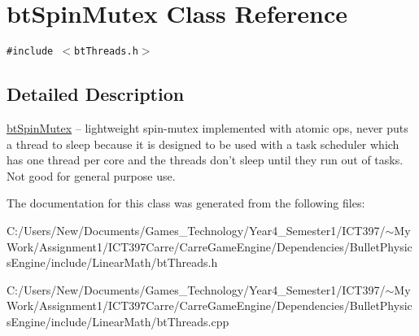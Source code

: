 \hypertarget{classbt_spin_mutex}{
\section{btSpinMutex Class Reference}
\label{classbt_spin_mutex}
}
{\tt \#include $<$btThreads.h$>$}



\subsection{Detailed Description}
\hyperlink{classbt_spin_mutex}{btSpinMutex} -- lightweight spin-mutex implemented with atomic ops, never puts a thread to sleep because it is designed to be used with a task scheduler which has one thread per core and the threads don't sleep until they run out of tasks. Not good for general purpose use. 

The documentation for this class was generated from the following files:\begin{CompactItemize}
\item 
C:/Users/New/Documents/Games\_\-Technology/Year4\_\-Semester1/ICT397/$\sim$My Work/Assignment1/ICT397Carre/CarreGameEngine/Dependencies/BulletPhysicsEngine/include/LinearMath/btThreads.h\item 
C:/Users/New/Documents/Games\_\-Technology/Year4\_\-Semester1/ICT397/$\sim$My Work/Assignment1/ICT397Carre/CarreGameEngine/Dependencies/BulletPhysicsEngine/include/LinearMath/btThreads.cpp\end{CompactItemize}
